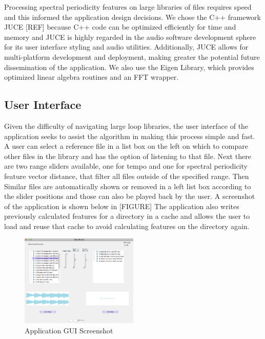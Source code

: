 \documentclass{article}
\begin{document}
Processing spectral periodicity features on large libraries of files requires speed and this informed the application design decisions. We chose the C++ framework JUCE [REF] because C++ code can be optimized efficiently for time and memory and JUCE is highly regarded in the audio software development sphere for its user interface styling and audio utilities. Additionally, JUCE allows for multi-platform development and deployment, making greater the potential future dissemination of the application. We also use the Eigen Library, which provides optimized linear algebra routines and an FFT wrapper.

\subsection{User Interface}
Given the difficulty of navigating large loop libraries, the user interface of the application seeks to assist the algorithm in making this process simple and fast. A user can select a reference file in a list box on the left on which to compare other files in the library and has the option of listening to that file. Next there are two range sliders available, one for tempo and one for spectral periodicity feature vector distance, that filter all files outside of the specified range. Then Similar files are automatically shown or removed in a left list box according to the slider positions and those can also be played back by the user. A screenshot of the application is shown below in [FIGURE] The application also writes previously calculated features for a directory in a cache and allows the user to load and reuse that cache to avoid calculating features on the directory again.

\begin{figure}[h!]
  \centering
    \includegraphics[width=0.5\textwidth]{fLoop_gui.png}
      \caption{Application GUI Screenshot}
\end{figure}
\end{document}
